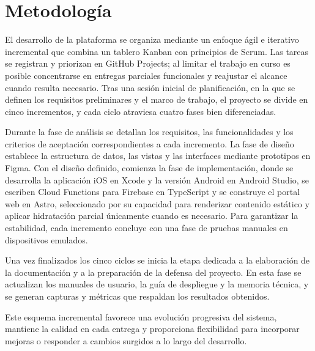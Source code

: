 \section{Metodología}
\begin{large}
El desarrollo de la plataforma se organiza mediante un enfoque ágil e iterativo incremental que combina un tablero Kanban con principios de Scrum. Las tareas se registran y priorizan en GitHub Projects; al limitar el trabajo en curso es posible concentrarse en entregas parciales funcionales y reajustar el alcance cuando resulta necesario. Tras una sesión inicial de planificación, en la que se definen los requisitos preliminares y el marco de trabajo, el proyecto se divide en cinco incrementos, y cada ciclo atraviesa cuatro fases bien diferenciadas.

Durante la fase de análisis se detallan los requisitos, las funcionalidades y los criterios de aceptación correspondientes a cada incremento. La fase de diseño establece la estructura de datos, las vistas y las interfaces mediante prototipos en Figma. Con el diseño definido, comienza la fase de implementación, donde se desarrolla la aplicación iOS en Xcode y la versión Android en Android Studio, se escriben Cloud Functions para Firebase en TypeScript y se construye el portal web en Astro, seleccionado por su capacidad para renderizar contenido estático y aplicar hidratación parcial únicamente cuando es necesario. Para garantizar la estabilidad, cada incremento concluye con una fase de pruebas manuales en dispositivos emulados.

Una vez finalizados los cinco ciclos se inicia la etapa dedicada a la elaboración de la documentación y a la preparación de la defensa del proyecto. En esta fase se actualizan los manuales de usuario, la guía de despliegue y la memoria técnica, y se generan capturas y métricas que respaldan los resultados obtenidos.

Este esquema incremental favorece una evolución progresiva del sistema, mantiene la calidad en cada entrega y proporciona flexibilidad para incorporar mejoras o responder a cambios surgidos a lo largo del desarrollo.
\end{large}

